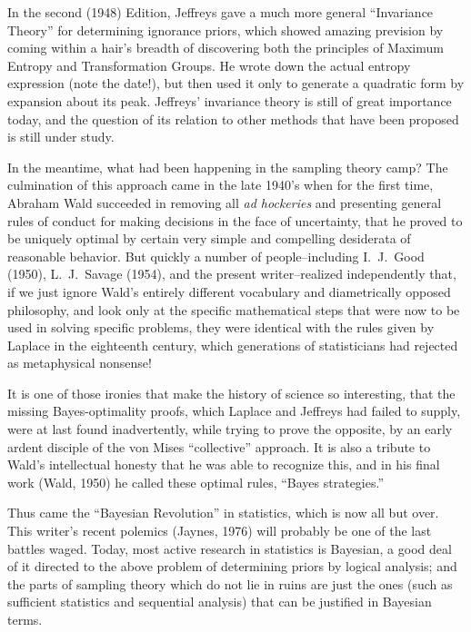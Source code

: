In the second (1948) Edition, Jeffreys gave a much more general ``Invariance Theory'' for determining ignorance priors, which showed amazing prevision by coming within a hair's breadth of discovering both the principles of Maximum Entropy and Transformation Groups.
He wrote down the actual entropy expression (note the date!), but then used it only to generate a quadratic form by expansion about its peak.
Jeffreys’ invariance theory is still of great importance today, and the question of its relation to other methods that have been proposed is still under study.

In the meantime, what had been happening in the sampling theory camp?
The culmination of this approach came in the late 1940's when for the first time, Abraham Wald succeeded in removing all \emph{ad hockeries} and presenting general rules of conduct for making decisions in the face of uncertainty, that he proved to be uniquely optimal by certain very simple and compelling desiderata of reasonable behavior.
But quickly a number of people--including I.~J.~Good (\cite{good}{1950}), L.~J.~Savage (\cite{savage}{1954}), and the present writer--realized independently that, if we just ignore Wald's entirely different vocabulary and diametrically opposed philosophy, and look only at the specific mathematical steps that were now to be used in solving specific problems, they were identical with the rules given by Laplace in the eighteenth century, which generations of statisticians had rejected as metaphysical nonsense!

It is one of those ironies that make the history of science so interesting, that the missing Bayes-optimality proofs, which Laplace and Jeffreys had failed to supply, were at last found inadvertently, while trying to prove the opposite, by an early ardent disciple of the von Mises ``collective'' approach.
It is also a tribute to Wald's intellectual honesty that he was able to recognize this, and in his final work (Wald, \cite{wald}{1950}) he called these optimal rules, ``Bayes strategies.''

Thus came the ``Bayesian Revolution'' in statistics, which is now all but over.
This writer's recent polemics (Jaynes, \cite{jaynes76}{1976}) will probably be one of the last battles waged.
Today, most active research in statistics is Bayesian, a good deal of it directed to the above problem of determining priors by logical analysis; and the parts of sampling theory which do not lie in ruins are just the ones (such as sufficient statistics and sequential analysis) that can be justified in Bayesian terms.

